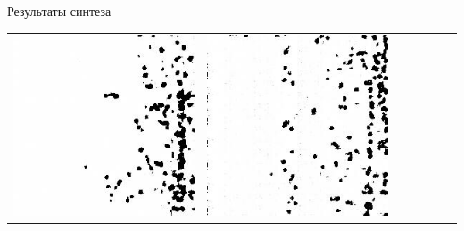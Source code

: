 \documentclass[12pt]{beamer}
\begin{document}
\begin{frame}{Результаты синтеза}
\begin{table}
\begin{center}
\begin{tabular}{p{1.2cm} p{1.2cm} p{1.2cm} p{1.2cm} p{1.2cm} p{1.2cm} p{1.2cm}}
					\includegraphics[width=1\linewidth]{8-results/sand-trend2/nf8/gen2}
					&
					\includegraphics[width=1\linewidth]{8-results/sand-trend2/nf16/gen2}
					&

\end{tabular}
\end{center}
\end{table}
\end{frame}
\end{document}

